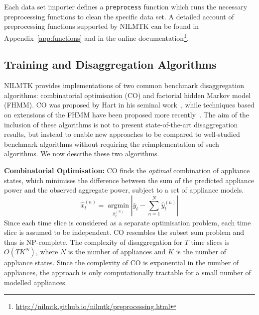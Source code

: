 \documentclass{sig-alternate}
\newcommand{\bluecolor}[1]{\textcolor{blue}{#1}}
\newcommand{\appref}[1]{Appendix~\ref{#1}}
\begin{document}
Each data set importer defines a \texttt{preprocess}
function which runs the necessary preprocessing functions to clean
the specific data set. A detailed account of preprocessing functions supported by NILMTK can be found in
\appref{app:functions} and in the online documentation\footnote{
  \url{http://nilmtk.github.io/nilmtk/preprocessing.html}}.

\subsection{Training and Disaggregation Algorithms}
\label{sec:training}
\noindent
NILMTK provides implementations of two common benchmark disaggregation algorithms: combinatorial optimisation (CO) and factorial hidden Markov model (FHMM). CO was proposed by Hart in his seminal work~\cite{hart_1992}, while techniques based on extensions of the FHMM have been proposed more recently~\cite{redd,kim_2011}. The aim of the inclusion of these algorithms is not to present state-of-the-art disaggregation results, but instead to enable new approaches to be compared to well-studied benchmark algorithms without requiring the reimplementation of such algorithms. We now describe these two algorithms.

\textbf{Combinatorial Optimisation:}
CO finds the \textit{optimal} combination of appliance states, which minimises the difference between the sum of the predicted appliance power and the observed aggregate power, subject to a set of appliance models. 
\begin{equation}
\hat{x}^{(n)}_t=\operatorname*{arg min}_{\hat{x}^{(n)}_t}\left|\bar{y}_t-\sum\limits_{n=1}^{N}\hat{y}^{(n)}_t\right|
\end{equation}
Since each time slice is considered as a separate optimisation problem, each time slice is assumed to be independent.
CO resembles the subset sum problem and thus is NP-complete. The complexity of disaggregation for $T$ time slices is $O(TK^N)$, where $N$ is the number of appliances and $K$ is the number of appliance states. Since the complexity of CO is exponential in the number of appliances, the approach is only computationally tractable for a small number of modelled appliances.
\end{document}
